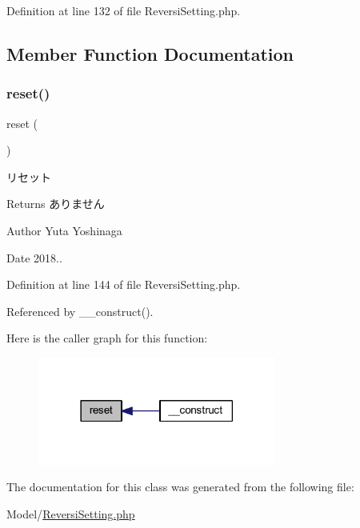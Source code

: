 Definition at line 132 of file Reversi\+Setting.\+php.



\subsection{Member Function Documentation}
\mbox{\label{class_reversi_setting_a4a20559544fdf4dcb457e258dc976cf8}} 
\subsubsection{\texorpdfstring{reset()}{reset()}}
{\footnotesize\ttfamily reset (\begin{DoxyParamCaption}{ }\end{DoxyParamCaption})}



リセット 

\begin{DoxyReturn}{Returns}
ありません 
\end{DoxyReturn}
\begin{DoxyAuthor}{Author}
Yuta Yoshinaga 
\end{DoxyAuthor}
\begin{DoxyDate}{Date}
2018.. 
\end{DoxyDate}


Definition at line 144 of file Reversi\+Setting.\+php.



Referenced by \+\_\+\+\_\+construct().

Here is the caller graph for this function\+:
\nopagebreak
\begin{figure}[H]
\begin{center}
\leavevmode
\includegraphics[width=222pt]{class_reversi_setting_a4a20559544fdf4dcb457e258dc976cf8_icgraph}
\end{center}
\end{figure}


The documentation for this class was generated from the following file\+:\begin{DoxyCompactItemize}
\item 
Model/\hyperlink{_reversi_setting_8php}{Reversi\+Setting.\+php}\end{DoxyCompactItemize}
